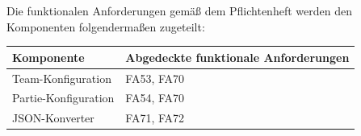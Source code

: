 	Die funktionalen Anforderungen gemäß dem Pflichtenheft werden den Komponenten folgendermaßen zugeteilt:

	\begin{table}[h]
	\centering
	\begin{tabular}{|l|l|}
		\hline
		\textbf{Komponente} & \textbf{Abgedeckte funktionale Anforderungen}\\ \hline
		Team-Konfiguration & FA53, FA70 \\ \hline
		
		Partie-Konfiguration & FA54, FA70 \\ \hline
		
		JSON-Konverter & FA71, FA72 \\ \hline

	
	\end{tabular}
	\end{table}